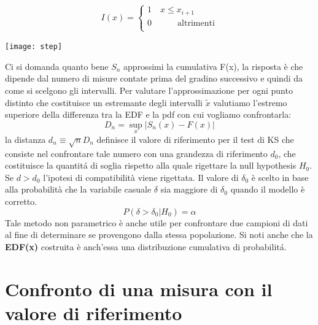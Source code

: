 \vspace{0.2in}

\begin{minipage}{.4\textwidth}
	\begin{align*}
I(x) = 
	\begin{cases}
	1 \quad x \leq x_{i+1} \\
	0 \quad \quad \quad \text{altrimenti}\\
	\end{cases}
\end{align*}
  \end{minipage}
  \begin{minipage}{.4\textwidth}
    \centering
    \texttt{[image: step]}	
  \end{minipage}
\vspace{0.2in}

Ci si domanda quanto bene $S_n$ approssimi la cumulativa F(x), la risposta \`{e} che dipende dal numero di misure contate prima del gradino successivo e quindi da come si scelgono gli intervalli. Per valutare l'approssimazione per ogni punto distinto che costituisce un estremante degli intervalli $\tilde{x}$ valutiamo l'estremo superiore della differenza tra la EDF e la pdf con cui vogliamo confrontarla:
\begin{equation*}
	D_n = \sup_{x} \vert S_n(x) -F(x) \vert 
\end{equation*}
 la distanza $d_n \equiv \sqrt{n}D_n$ definisce il valore di riferimento per il test di KS che consiste nel confrontare tale numero con una grandezza di riferimento $d_0$, che costituisce la quantit\'{a} di soglia rispetto alla quale rigettare la null hypothesis $H_0$. Se $d > d_0$ l'ipotesi di compatibilit\`{a} viene rigettata. Il valore di $\delta_0$ \`{e} scelto in base alla probabilit\`{a} che la variabile casuale $\delta$ sia maggiore di $\delta_0$ quando il modello \`{e} corretto.
 \begin{equation*}
 	P(\delta > \delta_0 \vert H_0) = \alpha
 \end{equation*}
Tale metodo non parametrico \`{e} anche utile per confrontare due campioni di dati al fine di determinare se provengono dalla stessa popolazione. Si noti anche che la \textbf{EDF(x)} costruita \`{e} anch'essa una distribuzione cumulativa di probabilit\'{a}.
 
 \section{Confronto di una misura con il valore di riferimento}
 
